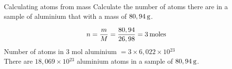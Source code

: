     \noindent
\label{m38717*secfhsst!!!underscore!!!id494}
      \noindent
      \begin{wex}{Calculating atoms from mass }{
\label{m38717*probfhsst!!!underscore!!!id495}
      \label{m38717*id277914}Calculate the number of atoms there are in a sample of aluminium that with a mass of $80,94\phantom{\rule{2pt}{0ex}}\text{g}$.
      }
{
      \label{m38717*id277959}\nopagebreak\noindent{}
        
    \begin{equation*}
    n=\frac{m}{M}=\frac{80,94}{26,98}=3\phantom{\rule{2pt}{0ex}}\text{moles}
      \end{equation*}
      \label{m38717*id278019}Number of atoms in 3 mol aluminium $=3\ensuremath{\times}6,022\ensuremath{\times}10{}^{23}$ \\
      \label{m38717*id278053}There are $18,069\ensuremath{\times}10{}^{23}$ aluminium atoms in a sample of $80,94\phantom{\rule{2pt}{0ex}}\text{g}$.
}
    \end{wex}
    \noindent
\label{m38717*secfhsst!!!underscore!!!id539}
